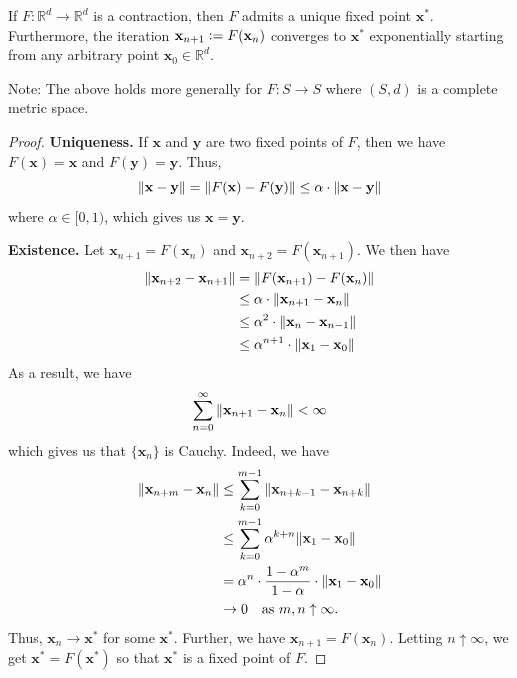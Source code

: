 \begin{lem}
    If $F \colon \mathbb{R}^d \to \mathbb{R}^d$ is a contraction, then $F$ admits a unique fixed point $\mathbf{x}^*$. Furthermore, the iteration $\mathbf{x}_{n+1} \vcentcolon= F(\mathbf{x}_n)$ converges to $\mathbf{x}^*$ exponentially starting from any arbitrary point $\mathbf{x}_0 \in \mathbb{R}^d$. 
\end{lem}
Note: The above holds more generally for $F \colon S \to S$ where $(S,d)$ is a complete metric space. 
\begin{proof}
    \textbf{Uniqueness.} If $\mathbf{x}$ and $\mathbf{y}$ are two fixed points of $F$, then we have $F(\mathbf{x}) = \mathbf{x}$ and $F(\mathbf{y}) = \mathbf{y}$. Thus, 
    \[
        \norm{\mathbf{x} - \mathbf{y}} = \norm{F(\mathbf{x}) - F(\mathbf{y})} \leq \alpha \cdot \norm{\mathbf{x} - \mathbf{y}}
    \]
    where $\alpha \in [0,1)$, which gives us $\mathbf{x} = \mathbf{y}$.

    \textbf{Existence.} Let $\mathbf{x}_{n+1} = F(\mathbf{x}_n)$ and $\mathbf{x}_{n+2} = F(\mathbf{x}_{n+1})$. We then have
    \begin{align*}
        \norm{\mathbf{x}_{n+2} - \mathbf{x}_{n+1}} &= \norm{F(\mathbf{x}_{n+1}) - F(\mathbf{x}_n)} \\
        &\leq \alpha \cdot \norm{\mathbf{x}_{n+1} - \mathbf{x}_n} \\
        &\leq \alpha^2 \cdot \norm{\mathbf{x}_n - \mathbf{x}_{n-1}} \\
        &\leq \alpha^{n+1} \cdot \norm{\mathbf{x}_1 - \mathbf{x}_0}
    \end{align*}
    As a result, we have
    \[
        \sum_{n=0}^{\infty} \norm{\mathbf{x}_{n+1} - \mathbf{x}_n} < \infty
    \]
    which gives us that $\{\mathbf{x}_n\}$ is Cauchy. Indeed, we have
    \begin{align*}
        \norm{\mathbf{x}_{n+m} - \mathbf{x}_n} &\leq \sum_{k=0}^{m-1} \norm{\mathbf{x}_{n+k-1} - \mathbf{x}_{n+k}} \\
        &\leq \sum_{k=0}^{m-1} \alpha^{k+n} \norm{\mathbf{x}_1 - \mathbf{x}_0} \\
        &= \alpha^n \cdot \frac{1-\alpha^m}{1-\alpha} \cdot \norm{\mathbf{x}_1 - \mathbf{x}_0} \\
        &\to 0 \quad \text{as } m,n \uparrow \infty.
    \end{align*}
    Thus, $\mathbf{x}_n \to \mathbf{x}^*$ for some $\mathbf{x}^*$. Further, we have $\mathbf{x}_{n+1} = F(\mathbf{x}_n)$. Letting $n \uparrow \infty$, we get $\mathbf{x}^* = F(\mathbf{x}^*)$ so that $\mathbf{x}^*$ is a fixed point of $F$. 
\end{proof}

